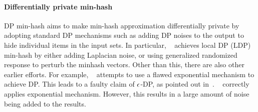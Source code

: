 \paragraph{Differentially private min-hash} DP min-hash aims to make min-hash approximation differentially private by adopting standard DP mechanisms such as adding DP noises to the output to hide individual items in the input sets. 
In particular, ~\cite{ sisap:AumBouSch20} achieves local DP (LDP) min-hash by either adding Laplacian noise, or using generalized randomized response to perturb the minhash vectors. 
Other than this, there are also other earlier efforts. For example, ~\cite{conc:YWRLLQ19} attempts to use a flawed exponential mechanism to achieve DP. This leads to a faulty claim of $\epsilon$-DP, as pointed out in~\cite{ sisap:AumBouSch20}. ~\cite{arxiv:YLLHQ17} correctly applies exponential mechanism. However, this results in a large amount of noise being added to the results.









